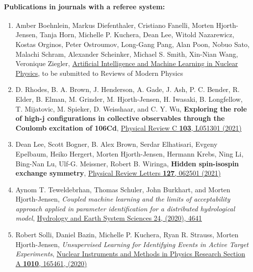 \documentclass[%
oneside,                 %
final,                   %
10pt]{article}
\begin{document}
\noindent
\paragraph{Publications in journals with a referee system:}
\begin{enumerate}
\item Amber Boehnlein, Markus Diefenthaler, Cristiano Fanelli, Morten Hjorth-Jensen, Tanja Horn, Michelle P. Kuchera, Dean Lee, Witold Nazarewicz, Kostas Orginos, Peter Ostroumov, Long-Gang Pang, Alan Poon, Nobuo Sato, Malachi Schram, Alexander Scheinker, Michael S. Smith, Xin-Nian Wang, Veronique Ziegler, \href{{https://arxiv.org/abs/2112.02309}}{Artificial Intelligence and Machine Learning in Nuclear Physics}, to be submitted to Reviews of Modern Physics

\item D. Rhodes, B. A. Brown, J. Henderson, A. Gade, J. Ash, P. C. Bender, R. Elder, B. Elman, M. Grinder, M. Hjorth-Jensen, H. Iwasaki, B. Longfellow, T. Mijatovic, M. Spieker, D. Weisshaar, and C. Y. Wu, \textbf{Exploring the role of high-j configurations in collective observables through the Coulomb excitation of 106Cd}, \href{{https://journals.aps.org/prc/abstract/10.1103/PhysRevC.103.L051301}}{Physical Review  C \textbf{103}, L051301 (2021)}

\item Dean Lee, Scott Bogner, B. Alex Brown, Serdar Elhatisari, Evgeny Epelbaum,  Heiko Hergert, Morten Hjorth-Jensen, Hermann Krebs, Ning Li, Bing-Nan Lu,  Ulf-G. Meissner, Robert B. Wiringa, \textbf{Hidden spin-isospin exchange symmetry}, \href{{https://journals.aps.org/prl/abstract/10.1103/PhysRevLett.127.062501}}{Physical Review Letters \textbf{127}, 062501 (2021)}

\item Aynom T. Teweldebrhan, Thomas Schuler, John Burkhart, and Morten Hjorth-Jensen, \emph{Coupled machine learning and the limits of acceptability approach applied in parameter identification for a distributed hydrological model}, \href{{https://hess.copernicus.org/articles/24/4641/2020/}}{Hydrology and Earth System Sciences 24, (2020), 4641}

\item Robert Solli, Daniel Bazin, Michelle P. Kuchera, Ryan R. Strauss, Morten Hjorth-Jensen, \emph{Unsupervised Learning for Identifying Events in Active Target Experiments}, \href{{https://www.sciencedirect.com/science/article/abs/pii/S0168900221004460}}{Nuclear Instruments and Methods in Physics Research Section A \textbf{1010}, 165461, (2020)}


\end{enumerate}
\end{document}
